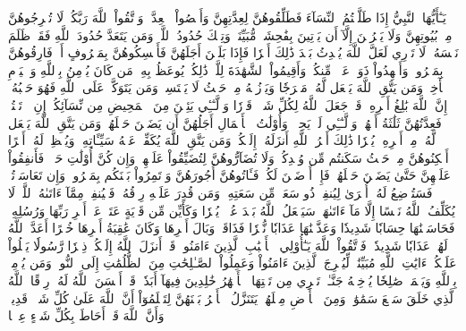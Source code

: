 يَـٰٓأَيُّهَا ٱلنَّبِيُّ إِذَا طَلَّقۡتُمُ ٱلنِّسَآءَ فَطَلِّقُوهُنَّ لِعِدَّتِهِنَّ وَأَحۡصُواْ ٱلۡعِدَّةَۖ وَٱتَّقُواْ ٱللَّهَ رَبَّكُمۡۖ لَا تُخۡرِجُوهُنَّ مِنۢ بُيُوتِهِنَّ وَلَا يَخۡرُجۡنَ إِلَّآ أَن يَأۡتِينَ بِفَٰحِشَةٖ مُّبَيِّنَةٖۚ وَتِلۡكَ حُدُودُ ٱللَّهِۚ وَمَن يَتَعَدَّ حُدُودَ ٱللَّهِ فَقَدۡ ظَلَمَ نَفۡسَهُۥۚ لَا تَدۡرِي لَعَلَّ ٱللَّهَ يُحۡدِثُ بَعۡدَ ذَٰلِكَ أَمۡرٗا
فَإِذَا بَلَغۡنَ أَجَلَهُنَّ فَأَمۡسِكُوهُنَّ بِمَعۡرُوفٍ أَوۡ فَارِقُوهُنَّ بِمَعۡرُوفٖ وَأَشۡهِدُواْ ذَوَيۡ عَدۡلٖ مِّنكُمۡ وَأَقِيمُواْ ٱلشَّهَٰدَةَ لِلَّهِۚ ذَٰلِكُمۡ يُوعَظُ بِهِۦ مَن كَانَ يُؤۡمِنُ بِٱللَّهِ وَٱلۡيَوۡمِ ٱلۡأٓخِرِۚ وَمَن يَتَّقِ ٱللَّهَ يَجۡعَل لَّهُۥ مَخۡرَجٗا
وَيَرۡزُقۡهُ مِنۡ حَيۡثُ لَا يَحۡتَسِبُۚ وَمَن يَتَوَكَّلۡ عَلَى ٱللَّهِ فَهُوَ حَسۡبُهُۥٓۚ إِنَّ ٱللَّهَ بَٰلِغُ أَمۡرِهِۦۚ قَدۡ جَعَلَ ٱللَّهُ لِكُلِّ شَيۡءٖ قَدۡرٗا
وَٱلَّـٰٓـِٔي يَئِسۡنَ مِنَ ٱلۡمَحِيضِ مِن نِّسَآئِكُمۡ إِنِ ٱرۡتَبۡتُمۡ فَعِدَّتُهُنَّ ثَلَٰثَةُ أَشۡهُرٖ وَٱلَّـٰٓـِٔي لَمۡ يَحِضۡنَۚ وَأُوْلَٰتُ ٱلۡأَحۡمَالِ أَجَلُهُنَّ أَن يَضَعۡنَ حَمۡلَهُنَّۚ وَمَن يَتَّقِ ٱللَّهَ يَجۡعَل لَّهُۥ مِنۡ أَمۡرِهِۦ يُسۡرٗا
ذَٰلِكَ أَمۡرُ ٱللَّهِ أَنزَلَهُۥٓ إِلَيۡكُمۡۚ وَمَن يَتَّقِ ٱللَّهَ يُكَفِّرۡ عَنۡهُ سَيِّـَٔاتِهِۦ وَيُعۡظِمۡ لَهُۥٓ أَجۡرًا
أَسۡكِنُوهُنَّ مِنۡ حَيۡثُ سَكَنتُم مِّن وُجۡدِكُمۡ وَلَا تُضَآرُّوهُنَّ لِتُضَيِّقُواْ عَلَيۡهِنَّۚ وَإِن كُنَّ أُوْلَٰتِ حَمۡلٖ فَأَنفِقُواْ عَلَيۡهِنَّ حَتَّىٰ يَضَعۡنَ حَمۡلَهُنَّۚ فَإِنۡ أَرۡضَعۡنَ لَكُمۡ فَـَٔاتُوهُنَّ أُجُورَهُنَّ وَأۡتَمِرُواْ بَيۡنَكُم بِمَعۡرُوفٖۖ وَإِن تَعَاسَرۡتُمۡ فَسَتُرۡضِعُ لَهُۥٓ أُخۡرَىٰ
لِيُنفِقۡ ذُو سَعَةٖ مِّن سَعَتِهِۦۖ وَمَن قُدِرَ عَلَيۡهِ رِزۡقُهُۥ فَلۡيُنفِقۡ مِمَّآ ءَاتَىٰهُ ٱللَّهُۚ لَا يُكَلِّفُ ٱللَّهُ نَفۡسًا إِلَّا مَآ ءَاتَىٰهَاۚ سَيَجۡعَلُ ٱللَّهُ بَعۡدَ عُسۡرٖ يُسۡرٗا
وَكَأَيِّن مِّن قَرۡيَةٍ عَتَتۡ عَنۡ أَمۡرِ رَبِّهَا وَرُسُلِهِۦ فَحَاسَبۡنَٰهَا حِسَابٗا شَدِيدٗا وَعَذَّبۡنَٰهَا عَذَابٗا نُّكۡرٗا
فَذَاقَتۡ وَبَالَ أَمۡرِهَا وَكَانَ عَٰقِبَةُ أَمۡرِهَا خُسۡرًا
أَعَدَّ ٱللَّهُ لَهُمۡ عَذَابٗا شَدِيدٗاۖ فَٱتَّقُواْ ٱللَّهَ يَـٰٓأُوْلِي ٱلۡأَلۡبَٰبِ ٱلَّذِينَ ءَامَنُواْۚ قَدۡ أَنزَلَ ٱللَّهُ إِلَيۡكُمۡ ذِكۡرٗا
رَّسُولٗا يَتۡلُواْ عَلَيۡكُمۡ ءَايَٰتِ ٱللَّهِ مُبَيِّنَٰتٖ لِّيُخۡرِجَ ٱلَّذِينَ ءَامَنُواْ وَعَمِلُواْ ٱلصَّـٰلِحَٰتِ مِنَ ٱلظُّلُمَٰتِ إِلَى ٱلنُّورِۚ وَمَن يُؤۡمِنۢ بِٱللَّهِ وَيَعۡمَلۡ صَٰلِحٗا يُدۡخِلۡهُ جَنَّـٰتٖ تَجۡرِي مِن تَحۡتِهَا ٱلۡأَنۡهَٰرُ خَٰلِدِينَ فِيهَآ أَبَدٗاۖ قَدۡ أَحۡسَنَ ٱللَّهُ لَهُۥ رِزۡقًا
ٱللَّهُ ٱلَّذِي خَلَقَ سَبۡعَ سَمَٰوَٰتٖ وَمِنَ ٱلۡأَرۡضِ مِثۡلَهُنَّۖ يَتَنَزَّلُ ٱلۡأَمۡرُ بَيۡنَهُنَّ لِتَعۡلَمُوٓاْ أَنَّ ٱللَّهَ عَلَىٰ كُلِّ شَيۡءٖ قَدِيرٞ وَأَنَّ ٱللَّهَ قَدۡ أَحَاطَ بِكُلِّ شَيۡءٍ عِلۡمَۢا